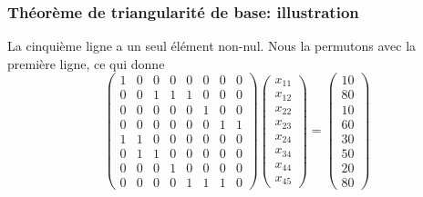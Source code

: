 \documentclass[usepdftitle=false]{beamer}
\begin{document}
\begin{frame}
\frametitle{Théorème de triangularité de base: illustration}

La cinquième ligne a un seul élément non-nul. Nous la permutons avec la première ligne, ce qui donne
\[
\begin{pmatrix}
 1 & 0 & 0 & 0 & 0 & 0 & 0 & 0 \\
 0 & 0 & 1 & 1 & 1 & 0 & 0 & 0 \\
 0 & 0 & 0 & 0 & 0 & 1 & 0 & 0 \\
 0 & 0 & 0 & 0 & 0 & 0 & 1 & 1 \\
 1 & 1 & 0 & 0 & 0 & 0 & 0 & 0 \\
 0 & 1 & 1 & 0 & 0 & 0 & 0 & 0 \\
 0 & 0 & 0 & 1 & 0 & 0 & 0 & 0 \\
 0 & 0 & 0 & 0 & 1 & 1 & 1 & 0
\end{pmatrix}
\begin{pmatrix}
x_{11} \\
x_{12} \\
x_{22} \\
x_{23} \\
x_{24} \\
x_{34} \\
x_{44} \\
x_{45}
\end{pmatrix}
=
\begin{pmatrix}
10 \\
80 \\
10 \\
60 \\
30 \\
50 \\
20 \\
80
\end{pmatrix}
\]

\end{frame}
\end{document}
